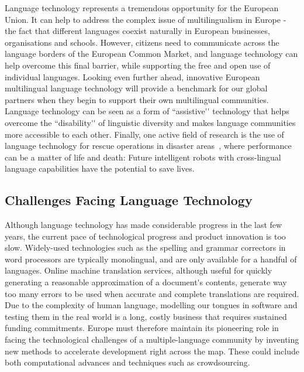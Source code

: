 \documentclass[]{../metanetpaper}
\begin{document}
\begin{multicols}{2}
Language technology represents a tremendous opportunity for the European Union. It can help to address the complex issue of multilingualism in Europe - the fact that different languages coexist naturally in European businesses, organisations and schools. However, citizens need to communicate across the language borders of the European Common Market, and language technology can help overcome this final barrier, while supporting the free and open use of individual languages. Looking even further ahead, innovative European multilingual language technology will provide a benchmark for our global partners when they begin to support their own multilingual communities. Language technology can be seen as a form of ``assistive{\mbox '}{\mbox '} technology that helps overcome the ``disability{\mbox '}{\mbox '} of linguistic diversity and makes language communities more accessible to each other. Finally, one active field of research is the use of language technology for rescue operations in disaster areas~\cite{resnick2011}, where performance can be a matter of life and death: Future intelligent robots with cross-lingual language capabilities have the potential to save lives.

\subsection{Challenges Facing Language Technology}

Although language technology has made considerable progress in the
last few years, the current pace of technological progress and product
innovation is too slow. Widely-used technologies such as the spelling
and grammar correctors in word processors are typically monolingual,
and are only available for a handful of languages. Online machine
translation services, although useful for quickly generating a
reasonable approximation of a document{\mbox '}s contents, generate way too
many errors to be used when accurate and complete translations are
required. Due to the complexity of human language, modelling our
tongues in software and testing them in the real world is a long,
costly business that requires sustained funding commitments. Europe
must therefore maintain its pioneering role in facing the
technological challenges of a multiple-language community by inventing
new methods to accelerate development right across the map. These
could include both computational advances and techniques such as
crowdsourcing.



\end{multicols}
\end{document}
